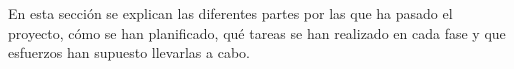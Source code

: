 En esta sección se explican las diferentes partes por las que ha pasado el proyecto, cómo se han planificado, qué tareas se han realizado en cada fase y que esfuerzos han supuesto llevarlas a cabo.